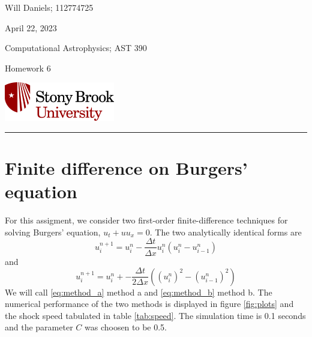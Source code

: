 \documentclass[12pt, letterpaper]{article}
\begin{document}
\noindent
\begin{minipage}{0.5\textwidth}
    Will Daniels; 112774725

    April 22, 2023

    Computational Astrophysics; AST 390

    Homework 6
\end{minipage}
%
\begin{minipage}{0.5\textwidth}
    \begin{flushright}
        \includegraphics[height = 48pt]{../../LatexAssets/SBULogoStacked}
    \end{flushright}
\end{minipage}
\noindent
\rule{\textwidth}{1pt}

\section{Finite difference on Burgers' equation}

For this assigment, we consider two first-order finite-difference techniques for
solving Burgers' equation, \( u_t + u u_x = 0 \). The two analytically identical
forms are
\begin{equation}
  u_i^{n+1} = u_i^n -
  \frac{\Delta t}{\Delta x} u_i^n \left( u_i^n - u_{i-1}^n \right)
  \label{eq:method_a}
\end{equation}
and
\begin{equation}
  u_i^{n+1} = u_i^n + -
  \frac{\Delta t}{2 \Delta x} \left(
    \left( u_i^n \right)^2 - \left( u_{i-1}^n \right)^2
    \label{eq:method_b}
  \right)
\end{equation}
We will call \eqref{eq:method_a} method a and \eqref{eq:method_b} method b. The
numerical performance of the two methods is displayed in figure \ref{fig:plots}
and the shock speed tabulated in table \ref{tab:speed}. The simulation time is
0.1 seconds and the parameter \(C\) was choosen to be 0.5.
\end{document}

